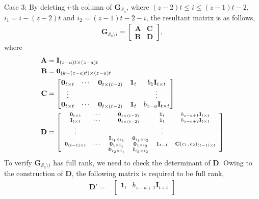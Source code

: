 \documentclass[journal,twocolumn]{IEEEtran}
\theoremstyle{definition}
\newcommand{\calS}{\mathcal{S}}
\newcommand{\bfG}{\mathbf{G}}
\newcommand{\bfI}{\mathbf{I}}
\newcommand{\bfC}{\mathbf{C}}
\newcommand{\bfD}{\mathbf{D}}
\newcommand{\bfA}{\mathbf{A}}
\newcommand{\bfzr}{\mathbf{0}}
\newcommand{\bfoe}{\mathbf{1}}
\begin{document}
\begin{itemize}
	Case 3: By deleting $i$-th column of $\bfG_{\calS_a}$, where $(z-2)t\le i\le (z-1)t-2$, $i_1 = i-(z-2)t$ and $i_2=(z-1)t-2-i$, the resultant matrix is as follows,
	\begin{align*}
		\bfG_{\calS_a \setminus i}=
		\left[
		\begin{array}{c|c}
			\mathbf A&\mathbf C\\  \hline
			\mathbf B&\mathbf D
		\end{array}
		\right],
	\end{align*}
	where \begin{align*}
		\bfA&= \bfI_{(z-a)t\times (z-a)t}\\
		\mathbf B &= \bfzr_{(k-(z-a)t)\times (z-a)t}\\
		\mathbf C &= \begin{bmatrix}
			\bfzr_{t\times t}&\cdots&\bfzr_{t\times (t-2)}&\bfoe_t&{b_1}\bfI_{t\times t}\\
			\vdots&&&&\vdots\\
			\bfzr_{t\times t}&\cdots&\bfzr_{t\times (t-2)}&\bfoe_t&{b_{z-a}}\bfI_{t\times t}
		\end{bmatrix}\\	 	  	
		\bfD&=\begin{scriptsize}
	\left[
		\begin{array}{cccccc}
			\bfzr_{t\times t} & \cdots &\multicolumn{2}{c}{\bfzr_{t\times (t-2)}} & \bfoe_t & {b_{z-a+1}}\bfI_{t\times t}\\
			\bfI_{t\times t} & \cdots & \multicolumn{2}{c}{\bfzr_{t\times (t-2)}} & \bfoe_t & {b_{z-a+2}}\bfI_{t\times t}\\
			\vdots&&&&\vdots\\
			\multirow{3}*{$\bfzr_{(t-1)\times t}$}&\multirow{3}*{$\cdots$}&\bfI_{i_1\times i_1}&\bfzr_{i_1\times i_2}&\multirow{3}*{$\bfoe_{t-1}$}&\multirow{3}*{$\bfC(c_1, c_2)_{(t-1)\times t}$}\\
			&&\bfzr_{1\times i_1}&\bfzr_{1\times i_2}&&\\
			&&\bfzr_{i_2\times i_1}&\bfI_{i_2\times i_2}&&
		\end{array}
		\right]
				\end{scriptsize}
	\end{align*}
	To verify $\bfG_{\calS_a\setminus i}$ has full rank, we need to check the determinant of $\bfD$. Owing to the construction of $\bfD$, the following matrix is required to be full rank,
	\begin{align*}
		\bfD'=&\begin{bmatrix}
			\bfoe_t&{b_{z-a+1}}\bfI_{t\times t}\\

\end{bmatrix}
\end{align*}
\end{itemize}
\end{document}
